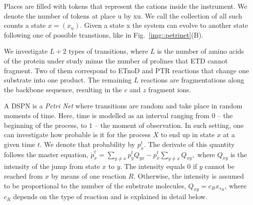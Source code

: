 \documentclass{llncs}
\begin{document}
        Places are filled with tokens that represent the cations inside the instrument.  We denote the number of tokens at place u by xu. We call the collection of all such counts a state $x=(x_u)$. Given a state x the system can evolve to another state following one of possible transtions, like in Fig.~\ref{img::petrinet}(B).

        We investigate $L+2$ types of transitions, where $L$ is the number of amino acids of the protein under study minus the number of prolines that ETD cannot fragment. Two of them correspond to ETnoD and PTR reactions that change one substrate into one product. The remaining $L$ reactions are fragmentations along the backbone sequence, resulting in the $c$ and $z$ fragment ions.

        A DSPN is a \textit{Petri Net} where transitions are random and take place in random moments of time. Here, time is modelled as an interval ranging from $0$ -- the beginning of the process, to $1$ -- the moment of observation. In such setting, one can investigate how probable is it for the process $X$ to end up in state $x$ at a given time $t$. We denote that probability by $p_x^t$. The derivate of this quantity follows the master equation, $\dot{p}_x^t = \sum_{y\not=x} p_y^t Q_{yx} - p_x^t \sum_{y\not=x} Q_{xy},$ where $Q_{xy}$ is the intensity of the jump from state $x$ to $y$. The intensity equals $0$ if $y$ cannot be reached from $x$ by means of one reaction $R$. Otherwise, the intensity is assumed to be proportional to the number of the substrate molecules, $Q_{xy}=c_R x_{s_R}$,  where $c_R$ depends on the type of reaction and is explained in detail below.
\end{document}
